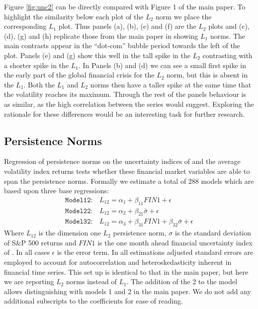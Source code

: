 \documentclass{article}
\begin{document}
Figure \ref{fig:unc2} can be directly compared with Figure 1 of the main paper. To highlight the similarity below each plot of the $L_2$ norm we place the corresponding $L_1$ plot. Thus panels (a), (b), (e) and (f) are the $L_2$ plots and (c), (d), (g) and (h) replicate those from the main paper in showing $L_1$ norms. The main contrasts appear in the ``dot-com'' bubble period towards the left of the plot. Panels (e) and (g) show this well in the tall spike in the $L_2$ contrasting with a shorter spike in the $L_1$. In Panels (b) and (d) we can see a small first spike in the early part of the global financial crisis for the $L_2$ norm, but this is absent in the $L_1$. Both the $L_1$ and $L_2$ norms then have a taller spike at the same time that the volatility reaches its maximum. Through the rest of the panels behaviour is as similar, as the high correlation between the series would suggest. Exploring the rationale for these differences would be an interesting task for further research. 

\subsection{Persistence Norms}

Regression of persistence norms on the uncertainty indices of \cite{jurado2015measuring} and the average volatility index returns tests whether these financial market variables are able to span the persistence norms. Formally we estimate a total of 288 models which are based upon three base regressions:
\begin{align}
    \mathtt{Model 12:} & L_{12} = \alpha_1 + \beta_{11}FIN1 + \epsilon \\
    \mathtt{Model 22:} & L_{12} = \alpha_2 + \beta_{21}\bar{\sigma} + \epsilon \\
    \mathtt{Model 32:} & L_{12} = \alpha_3 + \beta_{31}FIN1 + \beta_{32}\bar{\sigma} + \epsilon 
\end{align}
Where $L_{12}$ is the dimension one $L_2$ persistence norm, $\sigma$ is the standard deviation of S\&P 500 returns and $FIN1$ is the one month ahead financial uncertainty index of \cite{jurado2015measuring}. In all cases $\epsilon$ is the error term. In all estimations \cite{newey1987simple} adjusted standard errors are employed to account for autocorrelation and heteroskedasticity inherent in financial time series. This set up is identical to that in the main paper, but here we are reporting $L_2$ norms instead of $L_1$. The addition of the 2 to the model allows distinguishing with models 1 and 2 in the main paper. We do not add any additional subscripts to the coefficients for ease of reading.
\end{document}
